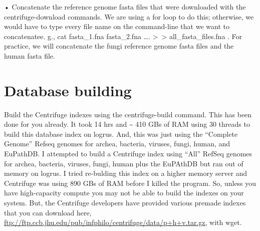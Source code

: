 \documentclass[
]{book}
\newenvironment{Shaded}{\begin{snugshade}}{\end{snugshade}}
\newcommand{\CommentTok}[1]{\textcolor[rgb]{0.56,0.35,0.01}{\textit{#1}}}
\newcommand{\ControlFlowTok}[1]{\textcolor[rgb]{0.13,0.29,0.53}{\textbf{#1}}}
\newcommand{\DataTypeTok}[1]{\textcolor[rgb]{0.13,0.29,0.53}{#1}}
\newcommand{\FunctionTok}[1]{\textcolor[rgb]{0.00,0.00,0.00}{#1}}
\newcommand{\KeywordTok}[1]{\textcolor[rgb]{0.13,0.29,0.53}{\textbf{#1}}}
\newcommand{\NormalTok}[1]{#1}
\newcommand{\OperatorTok}[1]{\textcolor[rgb]{0.81,0.36,0.00}{\textbf{#1}}}
\newcommand{\PreprocessorTok}[1]{\textcolor[rgb]{0.56,0.35,0.01}{\textit{#1}}}
\newcommand{\StringTok}[1]{\textcolor[rgb]{0.31,0.60,0.02}{#1}}
\newcommand{\VariableTok}[1]{\textcolor[rgb]{0.00,0.00,0.00}{#1}}
\begin{document}
• Concatenate the reference genome fasta files that were downloaded with the centrifuge-download commands. We are using
a for loop to do this; otherwise, we would have to type every file name on the command-line that we want to concatenatee.
g., cat fasta\_1.fna fasta\_2.fna \ldots. \textgreater{} \textgreater{} all\_fasta\_files.fna . For practice, we will concatenate the fungi reference genome
fasta files and the human fasta file.

\begin{Shaded}
\end{Shaded}

\hypertarget{database-building}{%
\section{Database building}\label{database-building}}

Build the Centrifuge indexes using the centrifuge-build command. This has been done for you already. It took 14
hrs and \textasciitilde{} 410 GBs of RAM using 30 threads to build this database index on logrus. And, this was just using the
``Complete Genome'' Refseq genomes for archea, bacteria, viruses, fungi, human, and EuPathDB. I attempted
to build a Centrifuge index using ``All'' RefSeq genomes for archea, bacteria, viruses, fungi, human plus the
EuPAthDB but ran out of memory on logrus. I tried re-bulding this index on a higher memory server and Centrifuge
was using 890 GBs of RAM before I killed the program. So, unless you have high-capacity compute you
may not be able to build the indexes on your system. But, the Centrifuge developers have provided various premade
indexes that you can download here, \url{ftp://ftp.ccb.jhu.edu/pub/infphilo/centrifuge/data/p+h+v.tar.gz},
with wget.
\end{document}

